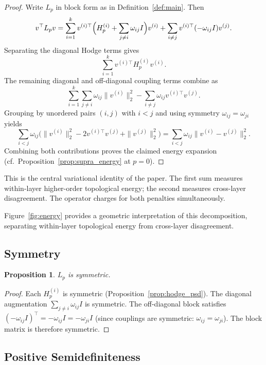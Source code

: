 \documentclass[11pt]{article}
\newtheorem{proposition}[theorem]{Proposition}
\theoremstyle{definition}
\theoremstyle{remark}
\begin{document}
\begin{proof}
Write $L_p$ in block form as in Definition~\ref{def:main}. Then
\[
  v^\top L_p v
  = \sum_{i=1}^k v^{(i)\top}\Bigl(H_p^{(i)} + \sum_{j\neq i}\omega_{ij}I\Bigr)v^{(i)}
    + \sum_{i\neq j} v^{(i)\top}(-\omega_{ij}I)v^{(j)}.
\]
Separating the diagonal Hodge terms gives
\[
  \sum_{i=1}^k v^{(i)\top}H_p^{(i)}v^{(i)}.
\]
The remaining diagonal and off-diagonal coupling terms combine as
\[
  \sum_{i=1}^k \sum_{j\neq i} \omega_{ij}\|v^{(i)}\|_2^2
  - \sum_{i\neq j}\omega_{ij}v^{(i)\top}v^{(j)}.
\]
Grouping by unordered pairs $(i,j)$ with $i<j$ and using symmetry $\omega_{ij}=\omega_{ji}$ yields
\[
  \sum_{i<j}\omega_{ij}\bigl(\|v^{(i)}\|_2^2 - 2v^{(i)\top}v^{(j)} + \|v^{(j)}\|_2^2\bigr)
  = \sum_{i<j}\omega_{ij}\|v^{(i)}-v^{(j)}\|_2^2.
\]
Combining both contributions proves the claimed energy expansion (cf.\ Proposition~\ref{prop:supra_energy} at $p=0$).
\end{proof}

This is the central variational identity of the paper. The first sum measures
within-layer higher-order topological energy; the second measures cross-layer
disagreement. The operator charges for both penalties simultaneously.

Figure~\ref{fig:energy} provides a geometric interpretation of this
decomposition, separating within-layer topological energy from cross-layer
disagreement.

\FigureAFive

\subsection{Symmetry}

\begin{proposition}
$L_p$ is symmetric.
\end{proposition}

\begin{proof}
Each $H_p^{(i)}$ is symmetric (Proposition~\ref{prop:hodge_psd}). The diagonal
augmentation $\sum_{j\neq i}\omega_{ij}I$ is symmetric. The off-diagonal block
satisfies $(-\omega_{ij}I)^\top = -\omega_{ij}I = -\omega_{ji}I$ (since
couplings are symmetric: $\omega_{ij}=\omega_{ji}$). The block matrix is
therefore symmetric.
\end{proof}

\subsection{Positive Semidefiniteness}
\end{document}
